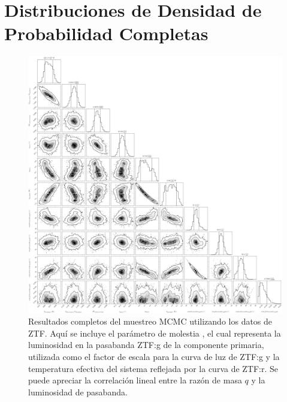 \section{Distribuciones de Densidad de Probabilidad Completas} \label{apendice:modelo_computacional_graficas:resultados_pdfs_completas}

\begin{figure}[!ht]
    \centering
    \includegraphics[scale=0.3]{Apendice/Figures/Figura MCMC ZTF Resultados Completos.png}
    \caption{Resultados completos del muestreo MCMC utilizando los datos de ZTF.
    Aquí se incluye el parámetro de molestia , el
    cual representa la luminosidad en la pasabanda ZTF:g de la componente
    primaria, utilizada como el factor de escala para la curva de luz de ZTF:g y
    la temperatura efectiva del sistema reflejada por la curva de ZTF:r. Se
    puede apreciar la correlación lineal entre la razón de masa $q$ y la
    luminosidad de pasabanda.}
    \label{figuraPhoebeMcmcResultadosCompletos}
\end{figure}